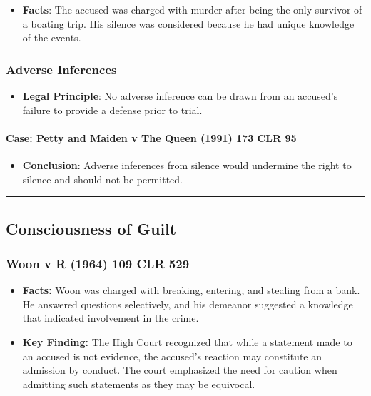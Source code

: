 \begin{itemize}
\tightlist
\item
  \textbf{Facts}: The accused was charged with murder after being the
  only survivor of a boating trip. His silence was considered because he
  had unique knowledge of the events.
\end{itemize}

\subsubsection{Adverse Inferences}\label{adverse-inferences}

\begin{itemize}
\tightlist
\item
  \textbf{Legal Principle}: No adverse inference can be drawn from an
  accused's failure to provide a defense prior to trial.
\end{itemize}

\paragraph{Case: Petty and Maiden v The Queen (1991) 173 CLR
95}\label{case-petty-and-maiden-v-the-queen-1991-173-clr-95}

\begin{itemize}
\tightlist
\item
  \textbf{Conclusion}: Adverse inferences from silence would undermine
  the right to silence and should not be permitted.
\end{itemize}

\begin{center}\rule{0.5\linewidth}{0.5pt}\end{center}

\subsection{  Consciousness of Guilt}\label{consciousness-of-guilt}

\subsubsection{Woon v R (1964) 109 CLR
529}\label{woon-v-r-1964-109-clr-529}

\begin{itemize}
\tightlist
\item
  \textbf{Facts:} Woon was charged with breaking, entering, and stealing
  from a bank. He answered questions selectively, and his demeanor
  suggested a knowledge that indicated involvement in the crime.
\item
  \textbf{Key Finding:} The High Court recognized that while a statement
  made to an accused is not evidence, the accused's reaction may
  constitute an admission by conduct. The court emphasized the need for
  caution when admitting such statements as they may be equivocal.
\end{itemize}

